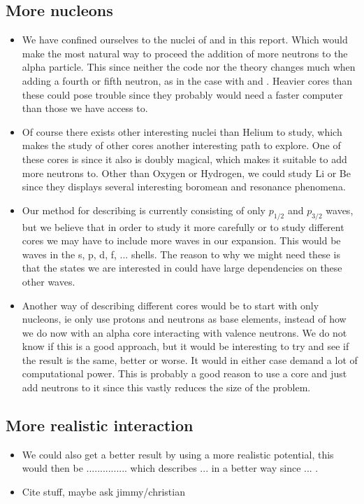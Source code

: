 \documentclass[../main/report.tex]{subfiles}
\begin{document}
\subsection{More nucleons}
  \begin{itemize}
    \item We have confined ourselves to the nuclei of  and  in this report.
    Which would make the most natural way to proceed the addition of more neutrons to the alpha particle.
    This since neither the code nor the theory changes much when adding a fourth or fifth neutron, as in the case with  and .
    Heavier cores than these could pose trouble since they probably would need a faster computer than those we have access to.

   \item Of course there exists other interesting nuclei than Helium to study, which makes the study of other cores another interesting path to explore.
   One of these cores is  since it also is doubly magical, which makes it suitable to add more neutrons to.
   Other than Oxygen or Hydrogen, we could study Li or Be since they displays several interesting boromean and resonance phenomena.

   \item Our method for describing  is currently consisting of only $p_{1/2}$ and $p_{3/2}$ waves, but we believe that in order to study it more carefully or to study different cores we may have to include more waves in our expansion.
   This would be waves in the s, p, d, f, ... shells.
   The reason to why we might need these is that the states we are interested in could have large dependencies on these other waves.

   \item Another way of describing different cores would be to start with only nucleons, ie only use protons and neutrons as base elements, instead of how we do now with an alpha core interacting with valence neutrons.
   We do not know if this is a good approach, but it would be interesting to try and see if the result is the same, better or worse.
   It would in either case demand a lot of computational power.
   This is probably a good reason to use a core and just add neutrons to it since this vastly reduces the size of the problem.
  \end{itemize}

\subsection{More realistic interaction}
  \begin{itemize}
   \item We could also get a better result by using a more realistic potential, this would then be ............... which describes ... in a better way since ... .
    \item Cite stuff, maybe ask jimmy/christian
  \end{itemize}
\end{document}
